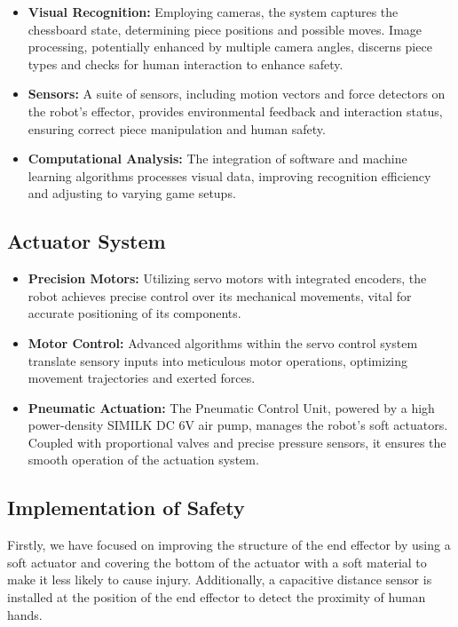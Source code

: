 \documentclass[10pt, a4paper, twocolumn]{article}
\begin{document}
\begin{itemize}
    \item \textbf{Visual Recognition:} Employing cameras, the system captures the chessboard state, determining piece positions and possible moves. Image processing, potentially enhanced by multiple camera angles, discerns piece types and checks for human interaction to enhance safety.
    \item \textbf{Sensors:} A suite of sensors, including motion vectors and force detectors on the robot's effector, provides environmental feedback and interaction status, ensuring correct piece manipulation and human safety.
    \item \textbf{Computational Analysis:} The integration of software and machine learning algorithms processes visual data, improving recognition efficiency and adjusting to varying game setups.
\end{itemize}

\subsection{Actuator System}

\begin{itemize}
    \item \textbf{Precision Motors:} Utilizing servo motors with integrated encoders, the robot achieves precise control over its mechanical movements, vital for accurate positioning of its components.
    \item \textbf{Motor Control:} Advanced algorithms within the servo control system translate sensory inputs into meticulous motor operations, optimizing movement trajectories and exerted forces.
    \item \textbf{Pneumatic Actuation:} The Pneumatic Control Unit, powered by a high power-density SIMILK DC 6V air pump, manages the robot's soft actuators. Coupled with proportional valves and precise pressure sensors, it ensures the smooth operation of the actuation system.
\end{itemize}

\subsection{Implementation of Safety}
Firstly, we have focused on improving the structure of the end effector by using a soft actuator and covering the bottom of the actuator with a soft material to make it less likely to cause injury. Additionally, a capacitive distance sensor is installed at the position of the end effector to detect the proximity of human hands.
\end{document}
